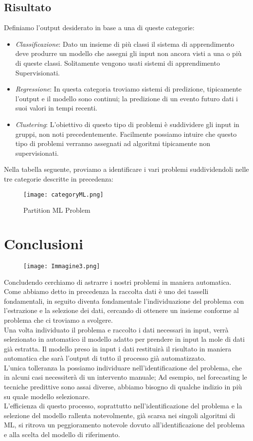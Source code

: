 \documentclass[../tesi.tex]{subfiles}
\begin{document}
\subsection{Risultato}
Definiamo l’output desiderato in base a una di queste categorie:

\begin{itemize}
  \item \textit{Classificazione}: Dato un insieme di più classi il sistema di apprendimento deve produrre un modello che assegni gli input non ancora visti a una o più di queste classi. Solitamente vengono usati sistemi di apprendimento Supervisionati.
  \item \textit{Regressione}: In questa categoria troviamo sistemi di predizione, tipicamente l’output e il modello sono continui; la predizione di un evento futuro dati i suoi valori in tempi recenti.
  \item \textit{Clustering}: L’obiettivo di questo tipo di problemi è suddividere gli input in gruppi, non noti precedentemente. Facilmente possiamo intuire che questo tipo di problemi verranno assegnati ad algoritmi tipicamente non supervisionati.
\end{itemize}

Nella tabella seguente, proviamo a identificare i vari problemi suddividendoli nelle tre categorie descritte in precedenza:
\begin{figure}[htbp]
  \texttt{[image: categoryML.png]}
  \caption{Partition ML Problem} 
  \end{figure}
  \newpage
\section{Conclusioni}
\begin{figure}[htbp]
  \centering
  \texttt{[image: Immagine3.png]} 
  \end{figure}
Concludendo cerchiamo di astrarre i nostri problemi in maniera automatica.\\
Come abbiamo detto in precedenza la raccolta dati è uno dei tasselli fondamentali, in seguito diventa fondamentale l’individuazione del problema con l’estrazione e la selezione dei dati, cercando di ottenere un insieme conforme al problema che ci troviamo a svolgere.\\
Una volta individuato il problema e raccolto i dati necessari in input, verrà selezionato in automatico il modello adatto per prendere in input la mole di dati già estratta. Il modello preso in input i dati restituirà il risultato in maniera automatica che sarà l’output di tutto il processo già automatizzato.\\
L’unica tolleranza la possiamo individuare nell’identificazione del problema, che in alcuni casi necessiterà di un intervento manuale; Ad esempio, nel forecasting le tecniche predittive sono assai diverse, abbiamo bisogno di qualche indizio in più su quale modello selezionare.\\
L’efficienza di questo processo, soprattutto nell’identificazione del problema e la selezione del modello rallenta notevolmente, già scarsa nei singoli algoritmi di ML, si ritrova un peggioramento notevole dovuto all’identificazione del problema e alla scelta del modello di riferimento.
\end{document}
